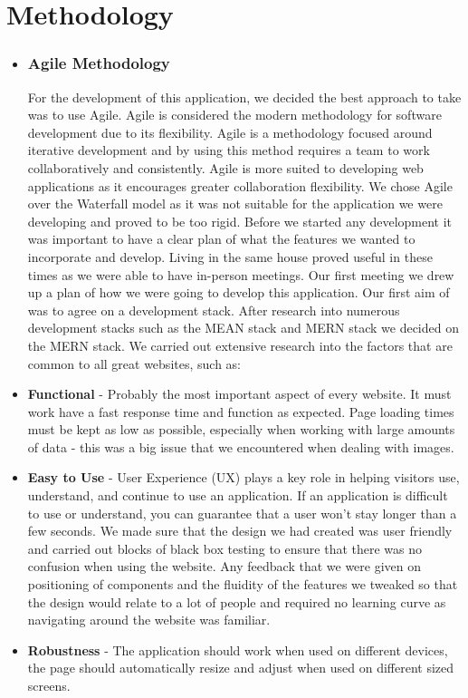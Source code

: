 \chapter{Methodology}
\begin{itemize}
\item 

\subsection{Agile Methodology}
For the development of this application, we decided the best approach to take was to use Agile. Agile is considered the modern methodology for software development due to its flexibility. Agile is a methodology focused around iterative development and by using this method requires a team to work collaboratively and consistently. Agile is more suited to developing web applications as it encourages greater collaboration flexibility. We chose Agile over the Waterfall model as it was not suitable for the application we were developing and proved to be too rigid. Before we started any development it was important to have a clear plan of what the features we wanted to incorporate and develop. Living in the same house proved useful in these times as we were able to have in-person meetings. Our first meeting we drew up a plan of how we were going to develop this application. Our first aim of was to agree on a development stack. After research into numerous development stacks such as the MEAN stack and MERN stack we decided on the MERN stack. We carried out extensive research into the factors that are common to all great websites, such as:

\item \textbf{Functional} - Probably the most important aspect of every website. It must work have a fast response time and function as expected. Page loading times must be kept as low as possible, especially when working with large amounts of data - this was a big issue that we encountered when dealing with images.
\item \textbf{Easy to Use} - User Experience (UX) plays a key role in helping visitors use, understand, and continue to use an application. If an application is difficult to use or understand, you can guarantee that a user won't stay longer than a few seconds. We made sure that the design we had created was user friendly and carried out blocks of black box testing to ensure that there was no confusion when using the website. Any feedback that we were given on positioning of components and the fluidity of the features we tweaked so that the design would relate to a lot of people and required no learning curve as navigating around the website was familiar.
\item \textbf{Robustness} - The application should work when used on different devices, the page should automatically resize and adjust when used on different sized screens.


\end{itemize}
